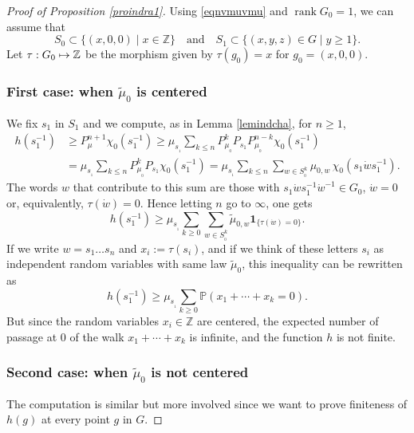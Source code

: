 \documentclass[JEP,XML,SOM,Unicode]{cedram}
\def\mto{\mathchoice{\longmapsto}{\mapsto}{\mapsto}{\mapsto}}
\DeclareMathOperator{\rank}{rank}
\theoremstyle{definition}
\newcommand{\m}[1]{\mathbb{ #1}}
\begin{document}
\begin{proof}[Proof of Proposition \ref{proindra1}]
Using \eqref{eqnvmuvmu} and $\rank G_0=1$, we can assume that
\[
S_0\subset \{ (x,0,0)\mid x\in \m Z\}
\quad\text{and}\quad
S_1\subset \{ (x,y,z)\in G\mid y\geq 1\}.
\]
Let $\tau:G_0\mto \m Z$ be the morphism given by
$\tau(g_0)=x$ for $g_0=(x,0,0)$.

\subsubsection*{First case: when $\widetilde{\mu}_0$ is centered}
We fix $s_1$ in $S_1$ and we compute, as in Lemma \ref{lemindcha}, for $n\geq 1$,
\begin{equation}
\label{eqnhspnch}
\begin{aligned}
h(s_1^{-1})&\geq
P_\mu^{n+1}\chi_0(s_1^{-1})
\geq
\mu_{s_{_1}}\sum_{k\leq n}
P^k_{\mu_{_0}}P_{s_1}P^{n-k}_{\mu_{_0}}\chi_0(s_1^{-1})\\
&=
\mu_{s_{_1}}\sum_{k\leq n}
P^k_{\mu_{_0}}P_{s_1}\chi_0(s_1^{-1})=
\mu_{s_{_1}}\sum_{k\leq n}
\sum_{w\in S_{_0}^k}\mu_{0,w}\,\chi_0(s_1\dot{w}s_1^{-1}).
\end{aligned}
\end{equation}
The words $w$ that contribute to this sum are those with
$s_1\dot{w}s_1^{-1}\dot{w}^{-1}\in G_0$, \ie
$\dot{w} =0$ or, equivalently, $\tau(\dot{w})=0.$
Hence letting $n$ go to $\infty$, one gets
\[
h(s_1^{-1})
\geq
\mu_{s_{_1}}\sum_{k\geq 0}
\sum_{w\in S_{_0}^k}\widetilde{\mu}_{0,w}\mathbf{1}_{\{\tau(\dot{w})=0\}}.
\]
If we write $w=s_1\ldots s_n$ and $x_i:=\tau(s_i)$,
and if we think of these letters $s_i$ as independent random variables with same law $\widetilde{\mu}_0$,
this inequality can be rewritten as
\[
h(s_1^{-1})
\geq
\mu_{s_{_1}}\sum_{k\geq 0}
\m P(x_1+\cdots +x_k=0).
\]
But since the random variables $x_i\in \m Z$ are centered,
the expected number of passage at $0$ of the walk $x_1+\cdots +x_k$ is infinite, and the function $h$ is not finite.

\subsubsection*{Second case: when $\widetilde{\mu}_0$ is not centered}
The computation is similar but more involved since
we want to prove finiteness of $h(g)$ at every point $g$ in $G$.


\end{proof}
\end{document}
